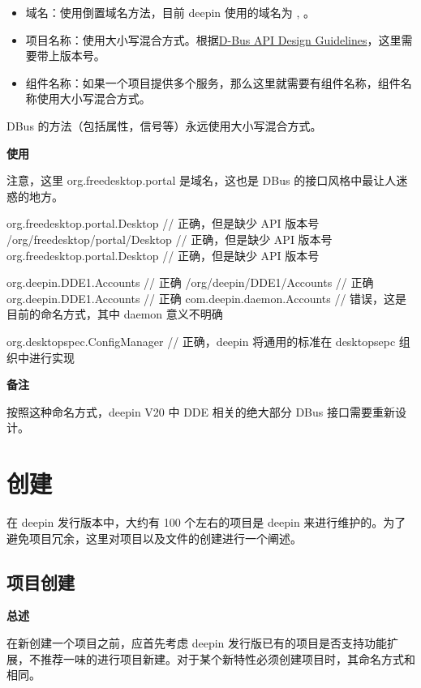 \begin{itemize}
  \item 域名：使用倒置域名方法，目前 deepin 使用的域名为 ,  。
  \item 项目名称：使用大小写混合方式。根据\href{https://dbus.freedesktop.org/doc/dbus-api-design.html}{D-Bus API Design Guidelines}，这里需要带上版本号。
  \item 组件名称：如果一个项目提供多个服务，那么这里就需要有组件名称，组件名称使用大小写混合方式。
\end{itemize}

DBus 的方法（包括属性，信号等）永远使用大小写混合方式。

\textbf{使用}

注意，这里 org.freedesktop.portal 是域名，这也是 DBus 的接口风格中最让人迷惑的地方。

\begin{cppcode}
  org.freedesktop.portal.Desktop      // 正确，但是缺少 API 版本号
  /org/freedesktop/portal/Desktop     // 正确，但是缺少 API 版本号
  org.freedesktop.portal.Desktop      // 正确，但是缺少 API 版本号
\end{cppcode}

\begin{cppcode}
  org.deepin.DDE1.Accounts       // 正确
  /org/deepin/DDE1/Accounts      // 正确
  org.deepin.DDE1.Accounts       // 正确
  com.deepin.daemon.Accounts     // 错误，这是目前的命名方式，其中 daemon 意义不明确

  org.desktopspec.ConfigManager  // 正确，deepin 将通用的标准在 desktopsepc 组织中进行实现
\end{cppcode}


\textbf{备注}

按照这种命名方式，deepin V20 中 DDE 相关的绝大部分 DBus 接口需要重新设计。

\chapter{创建}

在 deepin 发行版本中，大约有 100 个左右的项目是 deepin 来进行维护的。为了避免项目冗余，这里对项目以及文件的创建进行一个阐述。

\section{项目创建}

\textbf{总述}

在新创建一个项目之前，应首先考虑 deepin 发行版已有的项目是否支持功能扩展，不推荐一味的进行项目新建。对于某个新特性必须创建项目时，其命名方式和相同。

